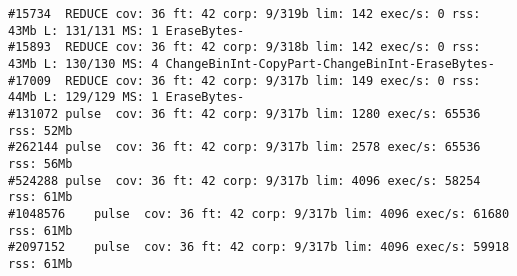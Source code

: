 \documentclass[serif]{beamer}
\begin{document}
\begin{frame}[fragile]
\begin{verbatim}
#15734	REDUCE cov: 36 ft: 42 corp: 9/319b lim: 142 exec/s: 0 rss: 43Mb L: 131/131 MS: 1 EraseBytes-
#15893	REDUCE cov: 36 ft: 42 corp: 9/318b lim: 142 exec/s: 0 rss: 43Mb L: 130/130 MS: 4 ChangeBinInt-CopyPart-ChangeBinInt-EraseBytes-
#17009	REDUCE cov: 36 ft: 42 corp: 9/317b lim: 149 exec/s: 0 rss: 44Mb L: 129/129 MS: 1 EraseBytes-
#131072	pulse  cov: 36 ft: 42 corp: 9/317b lim: 1280 exec/s: 65536 rss: 52Mb
#262144	pulse  cov: 36 ft: 42 corp: 9/317b lim: 2578 exec/s: 65536 rss: 56Mb
#524288	pulse  cov: 36 ft: 42 corp: 9/317b lim: 4096 exec/s: 58254 rss: 61Mb
#1048576	pulse  cov: 36 ft: 42 corp: 9/317b lim: 4096 exec/s: 61680 rss: 61Mb
#2097152	pulse  cov: 36 ft: 42 corp: 9/317b lim: 4096 exec/s: 59918 rss: 61Mb
\end{verbatim}
\end{frame}
\end{document}
